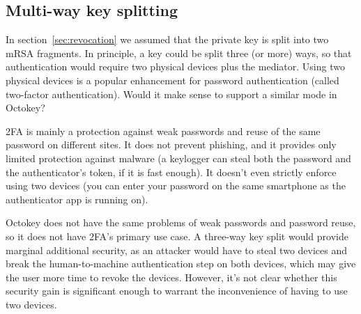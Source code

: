 \subsection{Multi-way key splitting}

In section~\ref{sec:revocation} we assumed that the private key is split into two mRSA fragments. In
principle, a key could be split three (or more) ways, so that authentication would require two
physical devices plus the mediator. Using two physical devices is a popular enhancement for
password authentication (called two-factor authentication). Would it make sense to support a similar
mode in Octokey?

2FA is mainly a protection against weak passwords and reuse of the same password on different sites.
It does not prevent phishing, and it provides only limited protection against malware (a keylogger
can steal both the password and the authenticator's token, if it is fast enough). It doesn't even
strictly enforce using two devices (you can enter your password on the same smartphone as the
authenticator app is running on).

Octokey does not have the same problems of weak passwords and password reuse, so it does not have
2FA's primary use case. A three-way key split would provide marginal additional security, as an
attacker would have to steal two devices and break the human-to-machine authentication step on both
devices, which may give the user more time to revoke the devices. However, it's not clear whether
this security gain is significant enough to warrant the inconvenience of having to use two devices.
